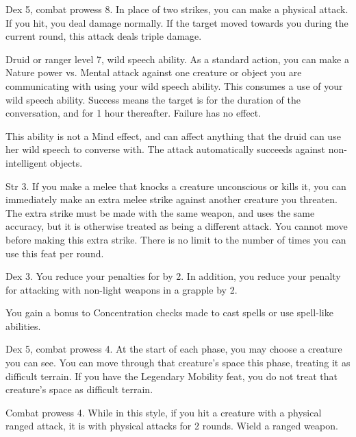 \featpres Dex 5, combat prowess 8.
\featben In place of two strikes, you can make a physical attack.
If you hit, you deal damage normally.
If the target moved towards you during the current round, this attack deals triple damage.

\featpres Druid or ranger level 7, wild speech ability.
\featben  As a standard action, you can make a Nature power vs. Mental attack against one creature or object you are communicating with using your wild speech ability.
This consumes a use of your wild speech ability.
Success means the target is \charmed for the duration of the conversation, and for 1 hour thereafter.
Failure has no effect.

This ability is not a Mind effect, and can affect anything that the druid can use her wild speech to converse with.
The attack automatically succeeds against non-intelligent objects.

\featpre Str 3.
\featben If you make a melee  that knocks a creature unconscious or kills it, you can immediately make an extra melee strike against another creature you threaten.
The extra strike must be made with the same weapon, and uses the same accuracy, but it is otherwise treated as being a different attack.
You cannot move before making this extra strike.
There is no limit to the number of times you can use this feat per round.

\featpre Dex 3.
\featben You reduce your penalties for  by 2. In addition, you reduce your penalty for attacking with non-light weapons in a grapple by 2.

\featben You gain a  bonus to Concentration checks made to cast spells or use spell-like abilities.

\featpres Dex 5, combat prowess 4.
\featben At the start of each phase, you may choose a creature you can see.
You can move through that creature's space this phase, treating it as difficult terrain.
 If you have the Legendary Mobility feat, you do not treat that creature's space as difficult terrain.

\featpres Combat prowess 4.
\featben While in this style, if you hit a creature with a physical ranged attack, it is \impaired with physical attacks for 2 rounds.
\stylereq Wield a ranged weapon.

